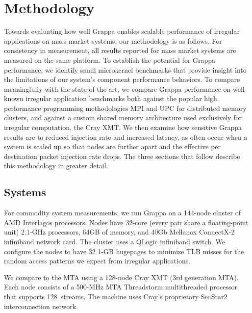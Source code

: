 \section{Methodology} \label{sec:method}
Towards evaluating how well Grappa enables scalable
performance of irregular applications on mass market systems, our
methodology is as follows.  For consistency in measurement, all
results reported for mass market systems are measured on the same
platform.  To establish the potential for Grappa performance, we
identify small microkernel benchmarks that provide insight into the
limitations of our system's component performance behaviors.  To
compare meaningfully with the state-of-the-art, we compare Grappa
performance on well known irregular application benchmarks both
against the popular high performance programming methodologies MPI and
UPC for distributed memory clusters, and against a custom shared memory
architecture used exclusively for irregular computation, the Cray XMT.
We then examine how sensitive Grappa results are to reduced
injection rate and increased latency, as often occur when a system is
scaled up so that nodes are further apart and the effective per
destination packet injection rate drops.
The three sections that follow describe this methodology in greater detail.

\subsection{Systems}
For commodity system measurements, we run Grappa on a 144-node cluster
of AMD Interlagos processors. Nodes have 32-core (every pair share a
floating-point unit) 2.1-GHz processors, 64GB of memory, and 40Gb
Mellanox ConnectX-2 infiniband network card.  The cluster uses a
QLogic infiniband switch.  We configure the nodes to have 32 1-GB
hugepages to minimize TLB misses for the random access patterns we
expect from irregular applications.

We compare to the MTA using a 128-node Cray XMT (3rd generation MTA).
Each node consists of a 500-MHz MTA Threadstorm multithreaded processor
that supports 128~streams. The machine uses Cray's proprietary SeaStar2
interconnection network.

